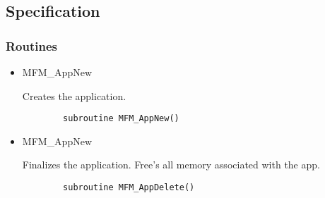 \subsection{Specification}

\subsubsection{Routines}

\begin{itemize}

\item{MFM\_AppNew}

Creates the application.

\begin{verbatim}
        subroutine MFM_AppNew()
\end{verbatim}

\item{MFM\_AppNew}

Finalizes the application.  Free's all memory associated with the app.

\begin{verbatim}
        subroutine MFM_AppDelete()
\end{verbatim}

\end{itemize}
